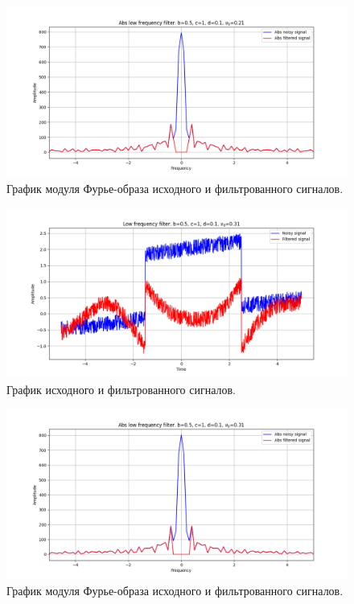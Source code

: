 \documentclass[a4paper, 12pt]{article}
\begin{document}
    \begin{figure}[!htb]
        \centering
        \includegraphics[scale=0.485]{2_abs_u_U_nolow.png}
        \captionsetup{skip=0pt}
        \caption{График модуля Фурье-образа исходного и фильтрованного сигналов.}
        \label{fig:fig30}
    \end{figure}
    \begin{figure}[!htb]
        \centering
        \includegraphics[scale=0.485]{3_u_flt_u_nolow.png}
        \captionsetup{skip=0pt}
        \caption{График исходного и фильтрованного сигналов.}
        \label{fig:fig31}
    \end{figure}
    \begin{figure}[!htb]
        \centering
        \includegraphics[scale=0.485]{3_abs_u_U_nolow.png}
        \captionsetup{skip=0pt}
        \caption{График модуля Фурье-образа исходного и фильтрованного сигналов.}
        \label{fig:fig32}
    \end{figure}
\end{document}
